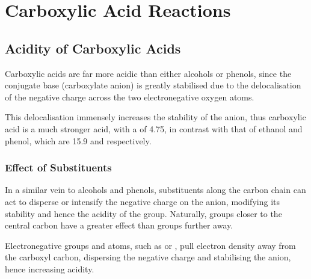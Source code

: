 

	\section{Carboxylic Acid Reactions}

		\subsection{Acidity of Carboxylic Acids}

			Carboxylic acids are far more acidic than either alcohols or phenols, since the conjugate base (carboxylate anion) is greatly
			stabilised due to the delocalisation of the negative charge across the two electronegative oxygen atoms.


			This delocalisation immensely increases the stability of the anion, thus carboxylic acid is a much stronger acid, with a \pKa of
			\num{4.75}, in contrast with that of ethanol and phenol, which are \num{15.9} and  respectively.

			\subsubsection{Effect of Substituents}

				In a similar vein to alcohols and phenols, substituents along the carbon chain can act to disperse or intensify the negative
				charge on the anion, modifying its stability and hence the acidity of the group. Naturally, groups closer to the central
				carbon have a greater effect than groups further away.

				Electronegative groups and atoms, such as \ch{\Cl} or , pull electron density away from the carboxyl carbon,
				dispersing the negative charge and stabilising the anion, hence increasing acidity.

